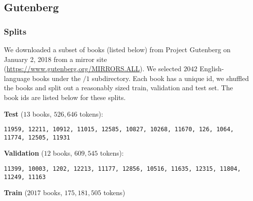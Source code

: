 \documentclass{article} \usepackage{hyperref}
\begin{document}
\subsection{Gutenberg}

\label{appendix:gutenberg}

\subsubsection{Splits}

We downloaded a subset of books (listed below) from Project Gutenberg on January 2, 2018 from a mirror site (\url{https://www.gutenberg.org/MIRRORS.ALL}). We selected $2042$ English-language books under the $/1$ subdirectory. Each book has a unique id, we shuffled the books and split out a reasonably sized train, validation and test set. The book ids are listed below for these splits.

\textbf{Test} ($13$ books, $526,646$ tokens):

\texttt{\tiny 11959, 12211, 10912, 11015, 12585, 10827, 10268, 11670, 126, 1064, 11774, 12505, 11931}

\textbf{Validation} ($12$ books, $609,545$ tokens):

\texttt{\tiny 11399,  10003,  1202,  12213,  11177,  12856,  10516,  11635,  12315,  11804,  11249,  11163}

\textbf{Train} ($2017$ books, $175,181,505$ tokens)
\end{document}

